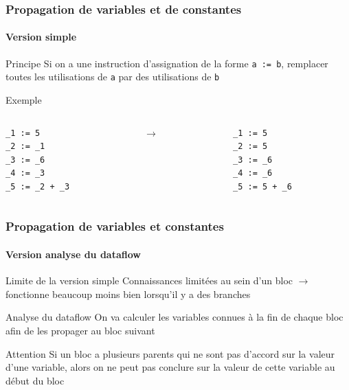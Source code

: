\documentclass{beamer}
\begin{document}
\begin{frame}[fragile]
    \frametitle{Propagation de variables et de constantes}
    \framesubtitle{Version simple}

    \begin{block}{Principe}
        Si on a une instruction d'assignation de la forme \lstinline{a := b}, remplacer
        toutes les utilisations de \lstinline{a} par des utilisations de \lstinline{b}
    \end{block}
    \pause
    \begin{exampleblock}{Exemple}
         \begin{columns}
            \begin{column}{.40\textwidth}
                    \begin{lstlisting}
_1 := 5
_2 := _1
_3 := _6
_4 := _3
_5 := _2 + _3
                    \end{lstlisting}
            \end{column}
            \pause
            \begin{column}{.04\textwidth}
                $\rightarrow$
            \end{column}
            \begin{column}{.40\textwidth}
                    \begin{lstlisting}
_1 := 5
_2 := 5
_3 := _6
_4 := _6
_5 := 5 + _6
                    \end{lstlisting}
            \end{column}
        \end{columns}       
    \end{exampleblock}
\end{frame}
\begin{frame}
    \frametitle{Propagation de variables et constantes}
    \framesubtitle{Version analyse du dataflow}

    \begin{block}{Limite de la version simple}
        Connaissances limitées au sein d'un bloc $\rightarrow$ fonctionne beaucoup moins bien lorsqu'il y a des branches
    \end{block}
    \pause
    \begin{block}{Analyse du dataflow}
        On va calculer les variables connues à la fin de chaque bloc afin de les propager au bloc suivant
    \end{block}

    \pause
    \begin{alertblock}{Attention}
        Si un bloc a plusieurs parents qui ne sont pas d'accord sur la valeur d'une variable,
        alors on ne peut pas conclure sur la valeur de cette variable au début du bloc
    \end{alertblock}
    
\end{frame}
\end{document}
